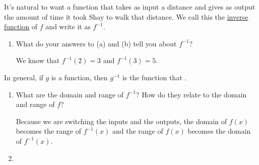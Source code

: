 \documentclass{article}
\begin{document}
\begin{enumerate}
\begin{minipage}[t]{\linewidth-2.6in}
  \end{minipage}

  It's natural to want a function that takes as input a distance and gives as output the amount of time it took Shay to walk that distance. We call this the \uline{inverse function} of $f$ and write it as $f^{-1}$.

  \begin{enumerate}[start=3]
  \item


    \begin{problem}[0.5in]
      What do your answers to (a) and (b) tell you about $f^{-1}$? 
    \end{problem}

    \begin{solution}
      We know that $f^{-1}(2)=3$ and $f^{-1}(3)=5$.
    \end{solution}

  \end{enumerate}

  In general, if $g$ is a function, then $g^{-1}$ is the function that  
  .

  \begin{enumerate}[resume]

  \item
    \begin{problem}[0.75in]
      What are the domain and range of $f^{-1}$? How do they relate to the domain and range of $f$?
    \end{problem}    

    \begin{solution} 
      Because we are switching the inputs and the outputs, the domain of $f(x)$ becomes the range of $f^{-1}(x)$ and the range of $f(x)$ becomes the domain of $f^{-1}(x)$.
    \end{solution}

  \item

\end{enumerate}
\end{enumerate}
\end{document}
